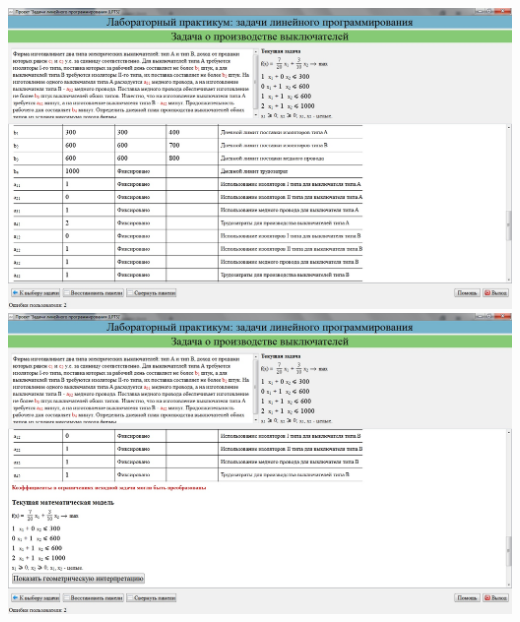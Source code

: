 \includegraphics[width=\linewidth]{om_hw_02/images/5_4.jpg}\\
\includegraphics[width=\linewidth]{om_hw_02/images/5_5.jpg}\\

\pagebreak